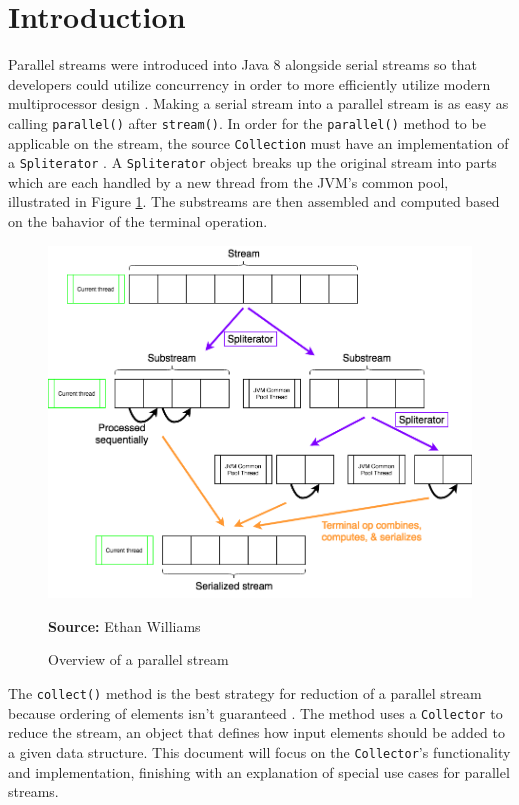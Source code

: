 \documentclass[oneside, 12pt]{article}
\newcommand{\source}[1]{\textbf{Source:} {#1} }
\begin{document}
\section{Introduction}
Parallel streams were introduced into Java 8 alongside serial streams so that developers could utilize concurrency in order to more efficiently utilize modern multiprocessor design \autocite{rapid7_overview}. Making a serial stream into a parallel stream is as easy as calling \verb|parallel()| after \verb|stream()|. In order for the \verb|parallel()| method to be applicable on the stream, the source \verb|Collection| must have an implementation of a \verb|Spliterator| \autocite{ibm_streams}. A \verb|Spliterator| object breaks up the original stream into parts which are each handled by a new thread from the JVM's common pool, illustrated in Figure \ref{fig:overview}. The substreams are then assembled and computed based on the bahavior of the terminal operation.

\begin{figure}[H]
\centering
\includegraphics[width=13cm]{../images/overview.png}
\caption{Overview of a parallel stream}
\source{Ethan Williams}
\label{fig:overview}
\end{figure}

The \verb|collect()| method is the best strategy for reduction of a parallel stream because ordering of elements isn't guaranteed \autocite{ibm_streams}. The method uses a \verb|Collector| to reduce the stream, an object that defines how input elements should be added to a given data structure. This document will focus on the \verb|Collector|'s functionality and implementation, finishing with an explanation of special use cases for parallel streams.
\end{document}
